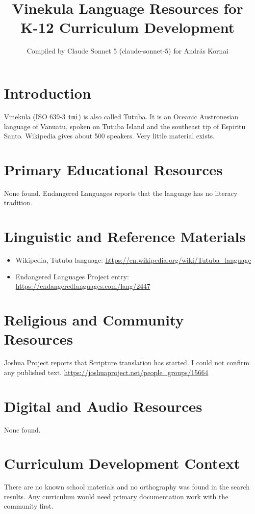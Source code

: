 \documentclass[12pt]{article}
\title{Vinekula Language Resources for K-12 Curriculum Development}
\author{Compiled by Claude Sonnet 5 (claude-sonnet-5) for Andr\'as Kornai}
\date{}
\begin{document}
\maketitle

\section{Introduction}
Vinekula (ISO 639-3 \texttt{tmi}) is also called Tutuba. It is an Oceanic Austronesian language of Vanuatu, spoken on Tutuba Island and the southeast tip of Espiritu Santo. Wikipedia gives about 500 speakers. Very little material exists.

\section{Primary Educational Resources}
None found. Endangered Languages reports that the language has no literacy tradition.

\section{Linguistic and Reference Materials}
\begin{itemize}
\item Wikipedia, Tutuba language: \url{https://en.wikipedia.org/wiki/Tutuba_language}
\item Endangered Languages Project entry: \url{https://endangeredlanguages.com/lang/2447}
\end{itemize}

\section{Religious and Community Resources}
Joshua Project reports that Scripture translation has started. I could not confirm any published text. \url{https://joshuaproject.net/people_groups/15664}

\section{Digital and Audio Resources}
None found.

\section{Curriculum Development Context}
There are no known school materials and no orthography was found in the search results. Any curriculum would need primary documentation work with the community first.
\end{document}
